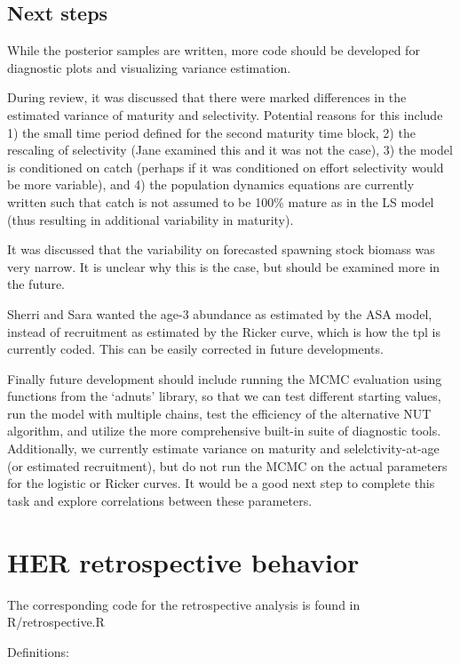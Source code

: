 \documentclass[]{article}
\begin{document}
\subsection{Next steps}\label{next-steps-2}

While the posterior samples are written, more code should be developed
for diagnostic plots and visualizing variance estimation.

During review, it was discussed that there were marked differences in
the estimated variance of maturity and selectivity. Potential reasons
for this include 1) the small time period defined for the second
maturity time block, 2) the rescaling of selectivity (Jane examined this
and it was not the case), 3) the model is conditioned on catch (perhaps
if it was conditioned on effort selectivity would be more variable), and
4) the population dynamics equations are currently written such that
catch is not assumed to be 100\% mature as in the LS model (thus
resulting in additional variability in maturity).

It was discussed that the variability on forecasted spawning stock
biomass was very narrow. It is unclear why this is the case, but should
be examined more in the future.

Sherri and Sara wanted the age-3 abundance as estimated by the ASA
model, instead of recruitment as estimated by the Ricker curve, which is
how the tpl is currently coded. This can be easily corrected in future
developments.

Finally future development should include running the MCMC evaluation
using functions from the `adnuts' library, so that we can test different
starting values, run the model with multiple chains, test the efficiency
of the alternative NUT algorithm, and utilize the more comprehensive
built-in suite of diagnostic tools. Additionally, we currently estimate
variance on maturity and selelctivity-at-age (or estimated recruitment),
but do not run the MCMC on the actual parameters for the logistic or
Ricker curves. It would be a good next step to complete this task and
explore correlations between these parameters.

\section{HER retrospective behavior}\label{her-retrospective-behavior}

The corresponding code for the retrospective analysis is found in
R/retrospective.R

Definitions:
\end{document}
